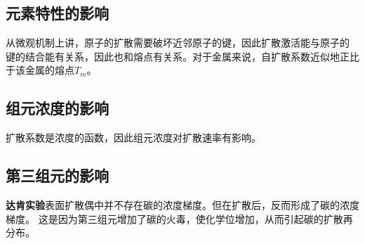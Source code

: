         \subsection{元素特性的影响}
            从微观机制上讲，原子的扩散需要破坏近邻原子的键，因此扩散激活能与原子的
            键的结合能有关系，因此也和熔点有关系。对于金属来说，自扩散系数近似地正比于该金属的熔点$T_m$。
        \subsection{组元浓度的影响}
            扩散系数是浓度的函数，因此组元浓度对扩散速率有影响。
        \subsection{第三组元的影响}
            \textbf{达肯实验}表面扩散偶中并不存在碳的浓度梯度。但在扩散后，反而形成了碳的浓度梯度。
            这是因为第三组元增加了碳的火毒，使化学位增加，从而引起碳的扩散再分布。
        